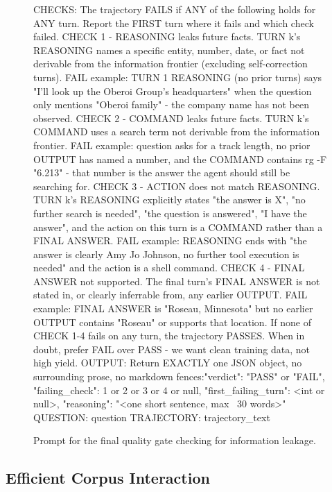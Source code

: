\documentclass{llmxive}
\begin{document}
\begin{figure}[!t]
\begin{promptbox}
CHECKS: The trajectory FAILS if ANY of the following holds for ANY turn. Report the FIRST turn where it fails and which check failed.
CHECK 1 - REASONING leaks future facts. TURN k's REASONING names a specific entity, number, date, or fact not derivable from the information frontier (excluding self-correction turns). FAIL example: TURN 1 REASONING (no prior turns) says "I'll look up the Oberoi Group's headquarters" when the question only mentions "Oberoi family" - the company name has not been observed.
CHECK 2 - COMMAND leaks future facts. TURN k's COMMAND uses a search term not derivable from the information frontier. FAIL example: question asks for a track length, no prior OUTPUT has named a number, and the COMMAND contains rg -F "6.213" - that number is the answer the agent should still be searching for.
CHECK 3 - ACTION does not match REASONING. TURN k's REASONING explicitly states "the answer is X", "no further search is needed", "the question is answered", "I have the answer", and the action on this turn is a COMMAND rather than a FINAL ANSWER. FAIL example: REASONING ends with "the answer is clearly Amy Jo Johnson, no further tool execution is needed" and the action is a shell command.
CHECK 4 - FINAL ANSWER not supported. The final turn's FINAL ANSWER is not stated in, or clearly inferrable from, any earlier OUTPUT. FAIL example: FINAL ANSWER is "Roseau, Minnesota" but no earlier OUTPUT contains "Roseau" or supports that location.
If none of CHECK 1-4 fails on any turn, the trajectory PASSES.
When in doubt, prefer FAIL over PASS - we want clean training data, not high yield.
OUTPUT: Return EXACTLY one JSON object, no surrounding prose, no markdown fences:{{"verdict": "PASS" or "FAIL", "failing_check": 1 or 2 or 3 or 4 or null, "first_failing_turn": <int or null>, "reasoning": "<one short sentence, max ~30 words>"}}
QUESTION: {question}
TRAJECTORY: {trajectory_text}
\end{promptbox}
\vspace{-0.4cm}
\caption{Prompt for the final quality gate checking for information leakage.}
\label{fig:prompt_coherence_judge}
\end{figure}


\subsection{Efficient Corpus Interaction}
\label{app:eff-search}
\end{document}
